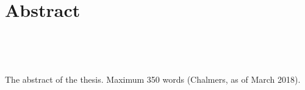 \section*{Abstract}
\begin{raggedright}
\noindent 
{\Large\textbf{\mytitle}}\\
\end{raggedright}

\vskip 1mm
\noindent
{\sc\authorname}
\vskip 1mm
\noindent
\textit{\mydepartment}\\
\textit{\chalIgu}

\vskip 8mm

The abstract of the thesis.
%
Maximum 350 words (Chalmers, as of March 2018).

\vspace{10 mm}

\vspace{3 mm}

